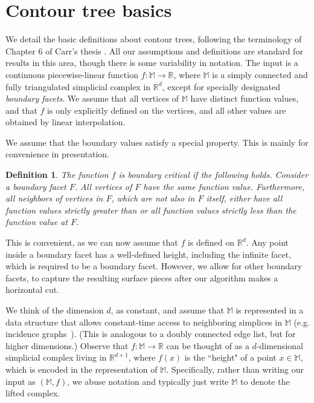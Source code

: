 \documentclass[11pt]{article}
\newtheorem{definition}[theorem]{Definition}
\theoremstyle{definition}
\newcommand{\MM}{\mathbb{M}}
\newcommand{\RR}{\mathbb{R}}
\begin{document}
\section{Contour tree basics} \label{sec:basics}

We detail the basic definitions about contour trees, following the terminology of Chapter 6 of Carr's thesis \cite{c-tmi-04}.
All our assumptions and definitions
are standard for results in this area, though there is some variability in notation.
The input is a continuous piecewise-linear function $f:\MM \to \RR$, where $\MM$ is a simply connected and fully triangulated simplicial complex in $\RR^d$,
except for specially designated \emph{boundary facets}. We assume that all vertices of $\MM$ have distinct function values, 
and that $f$ is only explicitly defined on the vertices, and all other values are obtained by linear interpolation. 

We assume that the boundary values satisfy a special property. This is mainly for convenience
in presentation.

\begin{definition} \label{def:bound} The function $f$ is \emph{boundary critical} if the following holds.
Consider a boundary facet $F$. All vertices of $F$ have the same function value. Furthermore, all
neighbors of vertices in $F$, which are not also in $F$ itself, 
either have all function values strictly greater than or all function values strictly less than the function value at $F$.
\end{definition}

This is convenient, as we can now assume that $f$ is defined on $\RR^d$. Any point inside a boundary facet
has a well-defined height, including the infinite facet, which is required to be a boundary facet.  However, 
we allow for other boundary facets, to capture the resulting surface pieces after our algorithm makes a horizontal cut. 

We think of the dimension $d$, as constant, and assume that $\MM$ is represented in a data structure that allows constant-time access to neighboring simplices
in $\MM$ (e.g. incidence graphs~\cite{Ed87}). (This is analogous to a doubly connected edge list, but for higher dimensions.)
Observe that $f:\MM \rightarrow \RR$ can be thought of as a $d$-dimensional simplicial complex living in $\RR^{d+1}$, 
where $f(x)$ is the ``height" of a point $x \in \MM$, which is encoded in the representation of $\MM$. 
Specifically, rather than writing our input as $(\MM,f)$, we abuse notation and typically just write $\MM$ to denote the lifted complex.
\end{document}
